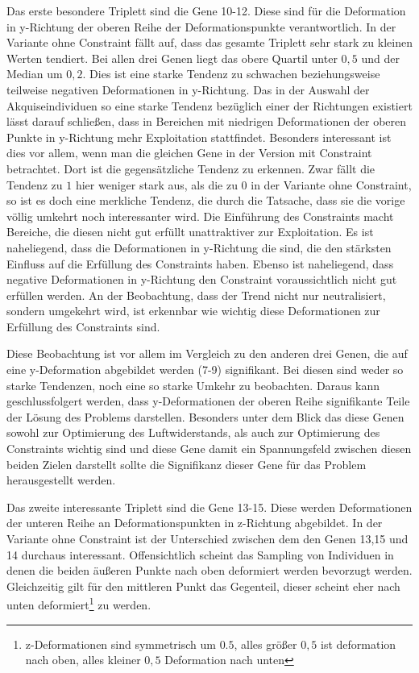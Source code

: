 Das erste besondere Triplett sind die Gene 10-12.
Diese sind für die Deformation in y-Richtung der oberen Reihe der Deformationspunkte verantwortlich.
In der Variante ohne Constraint fällt auf, dass das gesamte Triplett sehr stark zu kleinen Werten tendiert. 
Bei allen drei Genen liegt das obere Quartil unter $0,5$ und der Median um $0,2$.
Dies ist eine starke Tendenz zu schwachen beziehungsweise teilweise negativen Deformationen in y-Richtung.
Das in der Auswahl der Akquiseindividuen so eine starke Tendenz bezüglich einer der Richtungen existiert lässt darauf schließen, dass in Bereichen mit niedrigen Deformationen der oberen Punkte in y-Richtung mehr Exploitation stattfindet.
Besonders interessant ist dies vor allem, wenn man die gleichen Gene in der Version mit Constraint betrachtet.
Dort ist die gegensätzliche Tendenz zu erkennen.
Zwar fällt die Tendenz zu $1$ hier weniger stark aus, als die zu $0$ in der Variante ohne Constraint, so ist es doch eine merkliche Tendenz, die durch die Tatsache, dass sie die vorige völlig umkehrt noch interessanter wird.
Die Einführung des Constraints macht Bereiche, die diesen nicht gut erfüllt unattraktiver zur Exploitation.
Es ist naheliegend, dass die Deformationen in y-Richtung die sind, die den stärksten Einfluss auf die Erfüllung des Constraints haben.
Ebenso ist naheliegend, dass negative Deformationen in y-Richtung den Constraint voraussichtlich nicht gut erfüllen werden.
An der Beobachtung, dass der Trend nicht nur neutralisiert, sondern umgekehrt wird, ist erkennbar wie wichtig diese Deformationen zur Erfüllung des Constraints sind.

Diese Beobachtung ist vor allem im Vergleich zu den anderen drei Genen, die auf eine y-Deformation abgebildet werden (7-9) signifikant.
Bei diesen sind weder so starke Tendenzen, noch eine so starke Umkehr zu beobachten.
Daraus kann geschlussfolgert werden, dass y-Deformationen der oberen Reihe signifikante Teile der Lösung des Problems darstellen.
Besonders unter dem Blick das diese Genen sowohl zur Optimierung des Luftwiderstands, als auch zur Optimierung des Constraints wichtig sind und diese Gene damit ein Spannungsfeld zwischen diesen beiden Zielen darstellt sollte die Signifikanz dieser Gene für das Problem herausgestellt werden.

Das zweite interessante Triplett sind die Gene 13-15.
Diese werden Deformationen der unteren Reihe an Deformationspunkten in z-Richtung abgebildet.
In der Variante ohne Constraint ist der Unterschied zwischen dem den Genen 13,15 und 14 durchaus interessant.
Offensichtlich scheint das Sampling von Individuen in denen die beiden äußeren Punkte nach oben deformiert werden bevorzugt werden.
Gleichzeitig gilt für den mittleren Punkt das Gegenteil, dieser scheint eher nach unten deformiert\footnote{z-Deformationen sind symmetrisch um $0.5$, alles größer $0,5$ ist deformation nach oben, alles kleiner $0,5$ Deformation nach unten} zu werden.

